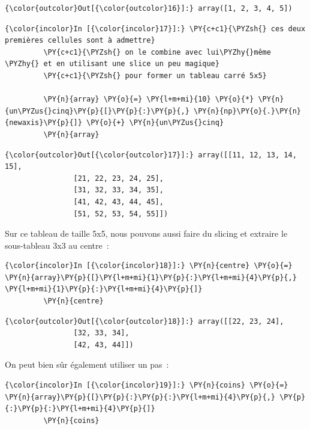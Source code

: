 \begin{Verbatim}[commandchars=\\\{\}]
{\color{outcolor}Out[{\color{outcolor}16}]:} array([1, 2, 3, 4, 5])
\end{Verbatim}
            
    \begin{Verbatim}[commandchars=\\\{\}]
{\color{incolor}In [{\color{incolor}17}]:} \PY{c+c1}{\PYZsh{} ces deux premières cellules sont à admettre}
         \PY{c+c1}{\PYZsh{} on le combine avec lui\PYZhy{}même \PYZhy{} et en utilisant une slice un peu magique}
         \PY{c+c1}{\PYZsh{} pour former un tableau carré 5x5}
         
         \PY{n}{array} \PY{o}{=} \PY{l+m+mi}{10} \PY{o}{*} \PY{n}{un\PYZus{}cinq}\PY{p}{[}\PY{p}{:}\PY{p}{,} \PY{n}{np}\PY{o}{.}\PY{n}{newaxis}\PY{p}{]} \PY{o}{+} \PY{n}{un\PYZus{}cinq}
         \PY{n}{array}
\end{Verbatim}


\begin{Verbatim}[commandchars=\\\{\}]
{\color{outcolor}Out[{\color{outcolor}17}]:} array([[11, 12, 13, 14, 15],
                [21, 22, 23, 24, 25],
                [31, 32, 33, 34, 35],
                [41, 42, 43, 44, 45],
                [51, 52, 53, 54, 55]])
\end{Verbatim}
            
    Sur ce tableau de taille 5x5, nous pouvons aussi faire du slicing et
extraire le sous-tableau 3x3 au centre~:

    \begin{Verbatim}[commandchars=\\\{\}]
{\color{incolor}In [{\color{incolor}18}]:} \PY{n}{centre} \PY{o}{=} \PY{n}{array}\PY{p}{[}\PY{l+m+mi}{1}\PY{p}{:}\PY{l+m+mi}{4}\PY{p}{,} \PY{l+m+mi}{1}\PY{p}{:}\PY{l+m+mi}{4}\PY{p}{]}
         \PY{n}{centre}
\end{Verbatim}


\begin{Verbatim}[commandchars=\\\{\}]
{\color{outcolor}Out[{\color{outcolor}18}]:} array([[22, 23, 24],
                [32, 33, 34],
                [42, 43, 44]])
\end{Verbatim}
            
    On peut bien sûr également utiliser un pas~:

    \begin{Verbatim}[commandchars=\\\{\}]
{\color{incolor}In [{\color{incolor}19}]:} \PY{n}{coins} \PY{o}{=} \PY{n}{array}\PY{p}{[}\PY{p}{:}\PY{p}{:}\PY{l+m+mi}{4}\PY{p}{,} \PY{p}{:}\PY{p}{:}\PY{l+m+mi}{4}\PY{p}{]}
         \PY{n}{coins}
\end{Verbatim}


